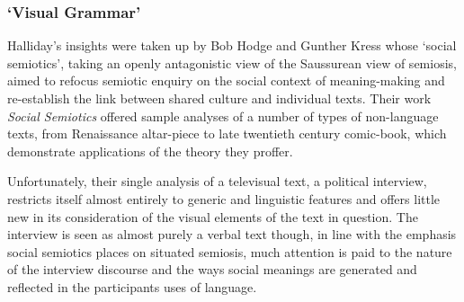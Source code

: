 



\subsubsection{`Visual Grammar'} %

Halliday's insights were taken up by Bob Hodge and Gunther Kress whose `social semiotics', taking an openly antagonistic view of the Saussurean view of semiosis, aimed to refocus semiotic enquiry on the social context of meaning-making and re-establish the link between shared culture and individual texts. Their \citeyear{Hodge:1988} work \textit{Social Semiotics} offered sample analyses of a number of types of non-language texts, from Renaissance altar-piece to late twentieth century comic-book, which demonstrate applications of the theory they proffer.

Unfortunately, their single analysis of a televisual text, a political interview, restricts itself almost entirely to generic and linguistic features and offers little new in its consideration of the visual elements of the text in question. The interview is seen as almost purely a verbal text though, in line with the emphasis social semiotics places on situated semiosis, much attention is paid to the nature of the interview discourse and the ways social meanings are generated and reflected in the participants uses of language. 


